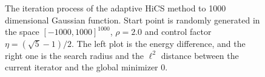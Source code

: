\documentclass[final,1p,times]{elsarticle}
\begin{document}
\begin{figure}[!htbp]
\begin{minipage}[b]{0.5\linewidth}
{	  }
	\end{minipage}
	  \caption{The iteration process of the adaptive HiCS method to 1000
	  dimensional Gaussian function. 
	  Start point is randomly generated in the space $[-1000,
	  1000]^{1000}$, $\rho=2.0$ and control factor
	  $\eta=(\sqrt{5}-1)/2$. The left plot is the energy
	  difference, and the right one is the search radius and 
	  the $\ell^2$ distance between the current iterator and the
	  global minimizer $0$.
	  } 
	  \label{fig:gauss:1000D}
\end{figure}

\end{document}
